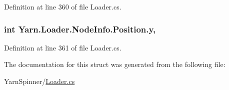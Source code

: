 Definition at line 360 of file Loader.\-cs.

\hypertarget{a00141_a390d560bd9faa3a32d8a0489c69be9e0}{
\subsubsection[{y}]{\setlength{\rightskip}{0pt plus 5cm}int Yarn.\-Loader.\-Node\-Info.\-Position.\-y\hspace{0.3cm}{\ttfamily [get]}, {\ttfamily [set]}}}\label{a00141_a390d560bd9faa3a32d8a0489c69be9e0}


Definition at line 361 of file Loader.\-cs.



The documentation for this struct was generated from the following file\-:\begin{DoxyCompactItemize}
\item 
Yarn\-Spinner/\hyperlink{a00294}{Loader.\-cs}\end{DoxyCompactItemize}
